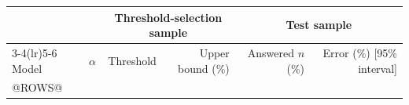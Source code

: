 \begin{tabular}{llrrrr}
\toprule
 & & \multicolumn{2}{c}{Threshold-selection sample} & \multicolumn{2}{c}{Test sample}\\
\cmidrule(lr){3-4}\cmidrule(lr){5-6}
Model & $\alpha$ & Threshold & Upper bound (\%) & Answered $n$ (\%) & Error (\%) [95\% interval]\\
\midrule
@ROWS@
\bottomrule
\end{tabular}
